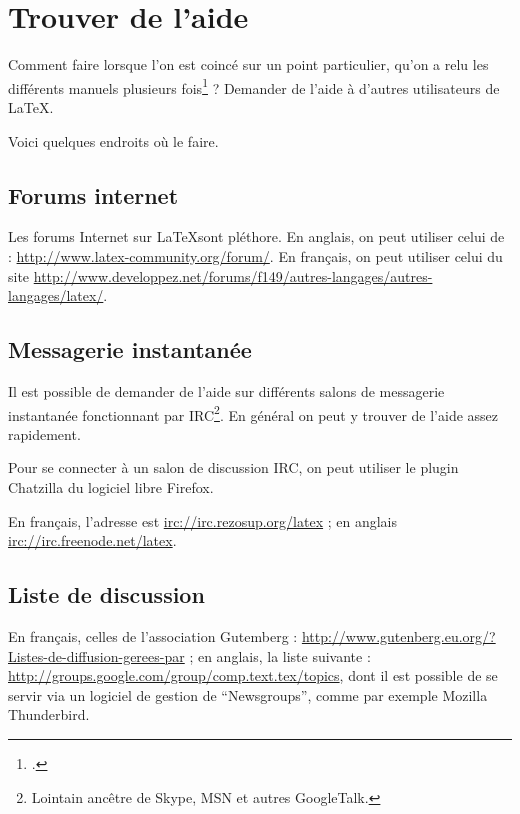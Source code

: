 \chapter{Trouver de l'aide}

\begin{intro}
Comment faire lorsque l'on est coincé sur un point particulier, qu'on a relu les différents manuels plusieurs fois\footcite[Signalons au passage la possibilité de télécharger une aide sur l'ensemble des erreurs de compilation avec \LaTeX :][]{erreurscompilo} ? Demander de l'aide à d'autres utilisateurs de \LaTeX{}.

Voici quelques endroits où le faire. 
\end{intro}


\section{Forums internet}

Les forums Internet sur \LaTeX sont pléthore. En anglais, on peut utiliser celui de  : \url{http://www.latex-community.org/forum/}. En français, on peut utiliser celui du site  \url{http://www.developpez.net/forums/f149/autres-langages/autres-langages/latex/}.


\section{Messagerie instantanée}

Il est possible de demander de l'aide sur différents salons de messagerie instantanée fonctionnant par IRC\footnote{Lointain ancêtre de Skype, MSN et autres GoogleTalk.}. En général on peut y trouver de l'aide assez rapidement.

Pour se connecter à un salon de discussion IRC, on peut utiliser le plugin Chatzilla du logiciel libre Firefox.

En français, l'adresse est \url{irc://irc.rezosup.org/latex} ; en anglais
\url{irc://irc.freenode.net/latex}.


\section{Liste de discussion}

En français, celles de l'association Gutemberg : \url{http://www.gutenberg.eu.org/?Listes-de-diffusion-gerees-par} ; en anglais,  la liste suivante : \url{http://groups.google.com/group/comp.text.tex/topics}, dont il est possible de se servir via un logiciel de gestion de \enquote{Newsgroups}, comme par exemple Mozilla Thunderbird.
